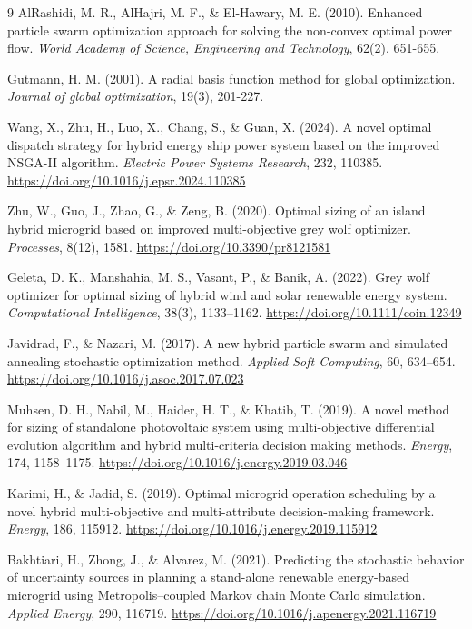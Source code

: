 \documentclass[final,3p,times]{elsarticle}
\begin{document}
\begin{thebibliography}{9}
AlRashidi, M. R., AlHajri, M. F., \& El-Hawary, M. E. (2010). Enhanced particle swarm optimization approach for solving the non-convex optimal power flow. \textit{World Academy of Science, Engineering and Technology}, 62(2), 651-655.

Gutmann, H. M. (2001). A radial basis function method for global optimization. \textit{Journal of global optimization}, 19(3), 201-227.

Wang, X., Zhu, H., Luo, X., Chang, S., \& Guan, X. (2024). A novel optimal dispatch strategy for hybrid energy ship power system based on the improved NSGA-II algorithm. \textit{Electric Power Systems Research}, 232, 110385. \url{https://doi.org/10.1016/j.epsr.2024.110385}

Zhu, W., Guo, J., Zhao, G., \& Zeng, B. (2020). Optimal sizing of an island hybrid microgrid based on improved multi-objective grey wolf optimizer. \textit{Processes}, 8(12), 1581. \url{https://doi.org/10.3390/pr8121581}

Geleta, D. K., Manshahia, M. S., Vasant, P., \& Banik, A. (2022). Grey wolf optimizer for optimal sizing of hybrid wind and solar renewable energy system. \textit{Computational Intelligence}, 38(3), 1133--1162. \url{https://doi.org/10.1111/coin.12349}

Javidrad, F., \& Nazari, M. (2017). A new hybrid particle swarm and simulated annealing stochastic optimization method. \textit{Applied Soft Computing}, 60, 634--654. \url{https://doi.org/10.1016/j.asoc.2017.07.023}

Muhsen, D. H., Nabil, M., Haider, H. T., \& Khatib, T. (2019). A novel method for sizing of standalone photovoltaic system using multi-objective differential evolution algorithm and hybrid multi-criteria decision making methods. \textit{Energy}, 174, 1158--1175. \url{https://doi.org/10.1016/j.energy.2019.03.046}

Karimi, H., \& Jadid, S. (2019). Optimal microgrid operation scheduling by a novel hybrid multi-objective and multi-attribute decision-making framework. \textit{Energy}, 186, 115912. \url{https://doi.org/10.1016/j.energy.2019.115912}

Bakhtiari, H., Zhong, J., \& Alvarez, M. (2021). Predicting the stochastic behavior of uncertainty sources in planning a stand-alone renewable energy-based microgrid using Metropolis--coupled Markov chain Monte Carlo simulation. \textit{Applied Energy}, 290, 116719. \url{https://doi.org/10.1016/j.apenergy.2021.116719}


\end{thebibliography}
\end{document}
